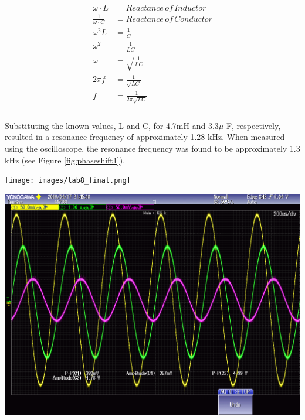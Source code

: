 \documentclass[journal]{IEEEtran}
\begin{document}
    \begin{equation}
        \begin{split}
            \omega \cdot L & = Reactance \, of \, Inductor \\
            \frac{1}{\omega \cdot C} & = Reactance\, of\,  Conductor \\ 
            \omega^2 L & = \frac{1}{C}\\
            \omega^2 & = \frac{1}{LC}\\
            \omega & = \sqrt{\frac{1}{LC}}\\
            2 \pi f & = \frac{1}{\sqrt{LC}} \\
            f & = \frac{1}{2 \pi \sqrt{LC}} \\
        \end{split}
        \label{eq:resfreq}
    \end{equation} \\
    
\noindent Substituting the known values, L and C, for 4.7mH and 3.3$\mu$ F, respectively, resulted in a resonance frequency of approximately 1.28 kHz. When measured using the oscilloscope, the resonance frequency was found to be approximately 1.3 kHz (see Figure \ref{fig:phaseshift1}).



\begingroup
    \centering
    \medskip
    \texttt{[image: images/lab8\_final.png]}
    \label{fig:phaseshift1}
    \medskip
\endgroup



\begingroup
    \centering
    \medskip
    \includegraphics[width=\columnwidth]{images/lab8_029.png}
    \label{fig:rlcosc2}
    \medskip
\endgroup
\end{document}
